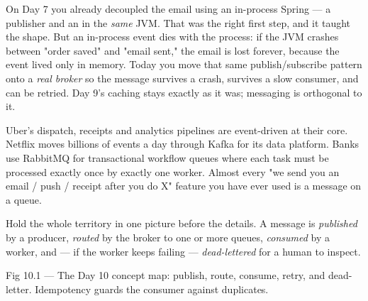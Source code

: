  On Day 7 you already decoupled the email using an in-process Spring  --- a publisher and an  in the \emph{same} JVM. That was the right first step, and it taught the shape. But an in-process event dies with the process: if the JVM crashes between "order saved" and "email sent," the email is lost forever, because the event lived only in memory. Today you move that same publish/subscribe pattern onto a \emph{real broker} so the message survives a crash, survives a slow consumer, and can be retried. Day 9's caching stays exactly as it was; messaging is orthogonal to it.

 Uber's dispatch, receipts and analytics pipelines are event-driven at their core. Netflix moves billions of events a day through Kafka for its data platform. Banks use RabbitMQ for transactional workflow queues where each task must be processed exactly once by exactly one worker. Almost every "we send you an email / push / receipt after you do X" feature you have ever used is a message on a queue.


Hold the whole territory in one picture before the details. A message is \emph{published} by a producer, \emph{routed} by the broker to one or more queues, \emph{consumed} by a worker, and --- if the worker keeps failing --- \emph{dead-lettered} for a human to inspect.

\begin{wbfigure}{Fig 10.1 --- The Day 10 concept map: publish, route, consume, retry, and dead-letter. Idempotency guards the consumer against duplicates.}
\end{wbfigure}

